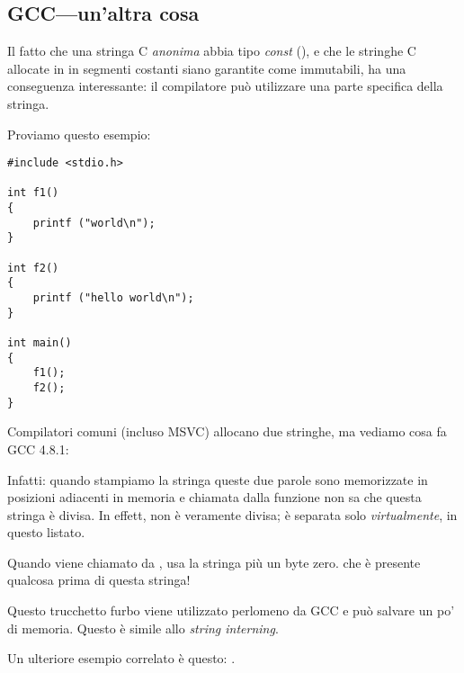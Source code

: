 \subsection{GCC---un'altra cosa}
\label{use_parts_of_C_strings}

Il fatto che una stringa C \emph{anonima} abbia tipo \emph{const} (),
e che le stringhe C allocate in in segmenti costanti siano garantite come immutabili, ha una conseguenza interessante:
il compilatore può utilizzare una parte specifica della stringa.

Proviamo questo esempio:

\begin{lstlisting}[style=customc]
#include <stdio.h>

int f1()
{
	printf ("world\n");
}

int f2()
{
	printf ("hello world\n");
}

int main()
{
	f1();
	f2();
}
\end{lstlisting}

Compilatori \CCpp{} comuni (incluso MSVC) allocano due stringhe, ma vediamo cosa fa GCC 4.8.1:



Infatti: quando stampiamo la stringa 
queste due parole sono memorizzate in posizioni adiacenti in memoria e \puts chiamata dalla funzione 
non sa che questa stringa è divisa.
In effett, non è veramente divisa; è separata solo \emph{virtualmente}, in questo listato.

Quando \puts viene chiamato da , usa la stringa  più un byte zero. \puts che è presente qualcosa prima di questa stringa!

Questo trucchetto furbo viene utilizzato perlomeno da GCC e può salvare un po' di memoria.
Questo è simile allo \emph{string interning}.

Un ulteriore esempio correlato è questo: .
